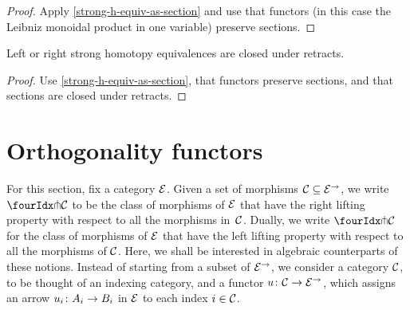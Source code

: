 \documentclass[reqno,10pt,a4paper,oneside]{amsart}
\begin{document}
\begin{proof}
Apply \cref{strong-h-equiv-as-section} and use that functors (in this case the Leibniz monoidal product in one variable) preserve sections.
\end{proof}

\begin{proposition}
\label{strong-h-equiv-closed-under-retract}
Left or right strong homotopy equivalences are closed under retracts.
\end{proposition}

\begin{proof}
Use \cref{strong-h-equiv-as-section},  that functors preserve sections, and that  sections are closed under retracts.
\end{proof}



\section{Orthogonality functors}
\label{sec-orthog-functors}



For this section, fix a category $\catE$. Given a set of morphisms $\cal{C} \subseteq \catE^\to$, we 
write $\liftr{\cal{C}}$ to be the class of morphisms of $\catE$ that have 
the right lifting property with respect to all the morphisms in~$\cal{C}$. Dually, we write $\liftl{\cal{C}}$ for the class of morphisms of $\catE$ that have the left lifting property with respect to all the morphisms of $\cal{C}$. 
Here, we shall be interested in algebraic counterparts of these notions. Instead of starting from a subset of $\catE^\to$, we consider a category $\cal{C}$, to be thought of an indexing category, and a functor $u \co \cal{C} \to \catE^\to$, which assigns an arrow $u_i \co A_i \to B_i$ in $\catE$ to each index $i \in \cal{C}$.
\end{document}
